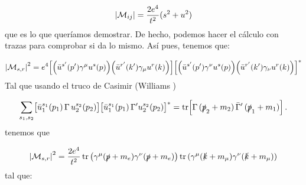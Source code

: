 \begin{equation}
    \vqty{\Mcal_{ij}} = \frac{2e^4}{t^2} (s^2+u^2)
\end{equation}
que es lo que queríamos demostrar. De hecho, podemos hacer el cálculo con trazas para comprobar si da lo mismo. Así pues, tenemos que:

\begin{equation}
	\vqty{\Mcal_{s,r}}^2 = e^4 \bqty{\pqty{\bar{u}^{s'}(p') \gamma^\mu u^{s}(p)}\pqty{\bar{u}^{r'}(k') \gamma_\mu u^{r}(k)}} \bqty{\pqty{\bar{u}^{s'}(p') \gamma^\nu u^{s}(p)}\pqty{\bar{u}^{r'}(k')\gamma_\nu u^{r}(k)}}^*
\end{equation}
Tal que usando el truco de Casimir (Williams \cite{Williams_2022})

\[
	\sum_{s_1,s_2}
	\bigl[\bar{u}_1^{s_1}(p_1)\,\Gamma\,u_2^{s_2}(p_2)\bigr]
	\bigl[\bar{u}_1^{s_1}(p_1)\,\Gamma' u_2^{s_2}(p_2)\bigr]^*
	= \mathrm{tr}\!\left[ \Gamma \,(\slashed{p}_2+m_2)\,\bar{\Gamma}'\,(\slashed{p}_1+m_1) \right].
\]
tenemos que

\begin{equation}
	\vqty{\Mcal_{s,r}}^2 =\frac{2e^4}{t^2} \tr \pqty{\gamma^\mu (\pslash+m_e)\gamma^\nu (\pslash+m_e)}\tr \pqty{\gamma^\mu (\kslash+m_\mu)\gamma^\nu (\kslash+m_\mu)}
\end{equation}
tal que:

